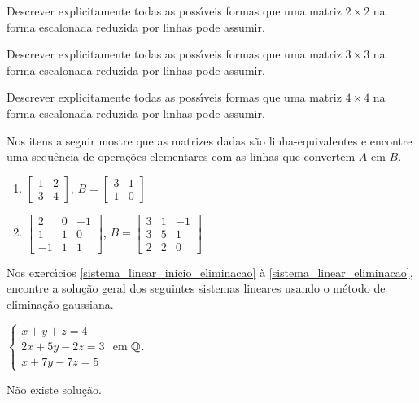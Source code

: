 \documentclass[12pt]{exam}
\begin{document}
\begin{exercicio}
  Descrever explicitamente todas as poss{\'\i}veis formas que uma matriz $2 \times 2$ na forma escalonada reduzida por linhas pode assumir.
\end{exercicio}

\begin{exercicio}
  Descrever explicitamente todas as poss{\'\i}veis formas que uma matriz $3 \times 3$ na forma escalonada reduzida por linhas pode assumir.
\end{exercicio}

\begin{exercicio}
  Descrever explicitamente todas as poss{\'\i}veis formas que uma matriz $4 \times 4$ na forma escalonada reduzida por linhas pode assumir.
\end{exercicio}

\begin{exercicio}
  Nos itens a seguir mostre que as matrizes dadas são linha-equivalentes e encontre uma sequência de operações elementares com as 
  linhas que convertem $A$ em $B$.
  \begin{enumerate}
    \item $\begin{bmatrix}1 & 2\\3 & 4\end{bmatrix}$, $B = \begin{bmatrix}3 & 1\\1 & 0\end{bmatrix}$
    \item $\begin{bmatrix}2 & 0 & -1\\1 & 1 & 0\\-1 & 1 & 1\end{bmatrix}$, $B = \begin{bmatrix}3 & 1 & -1\\3 & 5 & 1\\2 & 2 & 0\end{bmatrix}$
  \end{enumerate}
\end{exercicio}

Nos exerc{\'\i}cios \ref{sistema_linear_inicio_eliminacao} \`a \ref{sistema_linear_eliminacao}, encontre a solu\c{c}\~ao geral dos seguintes sistemas lineares usando o método de eliminação gaussiana.
\begin{exercicio}\label{sistema_linear_inicio_eliminacao}
  $
    \begin{cases}
      x + y + z = 4\\
      2x + 5y - 2z = 3\\
      x + 7y - 7z = 5
    \end{cases}
  $
  em $\mathbb{Q}$.
  \begin{solucao}
    N\~ao existe solu\c{c}\~ao.
  \end{solucao}
\end{exercicio}
\end{document}
